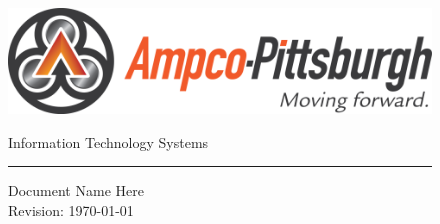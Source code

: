 \documentclass[10pt]{article}
\begin{document}

	\begin{figure}[ht]
	\begin{minipage}[ht][.7in][c]{0.3\linewidth}
		\centering
		\includegraphics[width=1\textwidth]{logo}
	\end{minipage}
	\hspace{0.5cm}
	\begin{minipage}[ht][.7in][c]{0.6\linewidth}
		\begin{flushright}
			{\color{Color1}\large Information Technology Systems}
			\rule{\linewidth}{1mm}
			{\color{Color1}\Large Document Name Here} \\ 
			{\normalfont Revision: \today }
		\end{flushright}
	\end{minipage}
	\end{figure}
  

	
	
\end{document}
